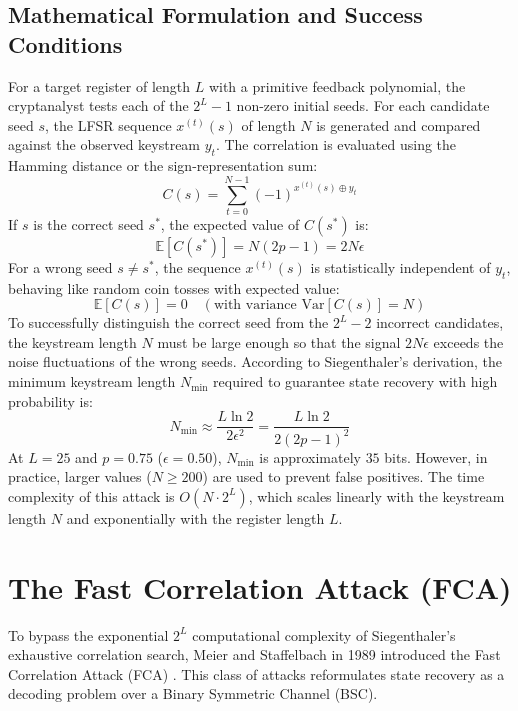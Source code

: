 \subsection{Mathematical Formulation and Success Conditions}
For a target register of length $L$ with a primitive feedback polynomial, the cryptanalyst tests each of the $2^L-1$ non-zero initial seeds. For each candidate seed $s$, the LFSR sequence $x^{(t)}(s)$ of length $N$ is generated and compared against the observed keystream $y_t$. The correlation is evaluated using the Hamming distance or the sign-representation sum:
\begin{equation}
C(s) = \sum_{t=0}^{N-1} (-1)^{x^{(t)}(s) \oplus y_t}
\label{eq:exhaustive_correlation_sum}
\end{equation}
If $s$ is the correct seed $s^*$, the expected value of $C(s^*)$ is:
$$\mathbb{E}[C(s^*)] = N(2p - 1) = 2N\epsilon$$
For a wrong seed $s \neq s^*$, the sequence $x^{(t)}(s)$ is statistically independent of $y_t$, behaving like random coin tosses with expected value:
$$\mathbb{E}[C(s)] = 0 \quad (\text{with variance } \text{Var}[C(s)] = N)$$
To successfully distinguish the correct seed from the $2^L-2$ incorrect candidates, the keystream length $N$ must be large enough so that the signal $2N\epsilon$ exceeds the noise fluctuations of the wrong seeds. According to Siegenthaler's derivation, the minimum keystream length $N_{\text{min}}$ required to guarantee state recovery with high probability is:
\begin{equation}
N_{\text{min}} \approx \frac{L \ln 2}{2\epsilon^2} = \frac{L \ln 2}{2(2p-1)^2}
\label{eq:siegenthaler_limit}
\end{equation}
At $L = 25$ and $p = 0.75$ ($\epsilon = 0.50$), $N_{\text{min}}$ is approximately $35$ bits. However, in practice, larger values ($N \ge 200$) are used to prevent false positives. The time complexity of this attack is $O(N \cdot 2^L)$, which scales linearly with the keystream length $N$ and exponentially with the register length $L$.

\section{The Fast Correlation Attack (FCA)}
\label{sec:fast_correlation_attacks}

To bypass the exponential $2^L$ computational complexity of Siegenthaler's exhaustive correlation search, Meier and Staffelbach in 1989 introduced the Fast Correlation Attack (FCA) \cite{meier1989}. This class of attacks reformulates state recovery as a decoding problem over a Binary Symmetric Channel (BSC).

